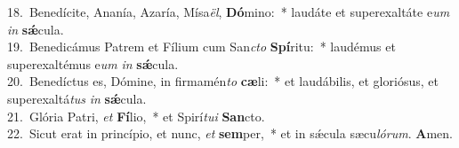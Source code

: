 {18.~}Benedícite, Ananía, Azaría, Mísa\textit{ël}, \textbf{Dó}mino:~* laudáte et superexaltáte e\textit{um} \textit{in} \textbf{sǽ}cula.\\
{19.~}Benedicámus Patrem et Fílium cum San\textit{cto} \textbf{Spí}ritu:~* laudémus et superexaltémus e\textit{um} \textit{in} \textbf{sǽ}cula.\\
{20.~}Benedíctus es, Dómine, in firmamén\textit{to} \textbf{cæ}li:~* et laudábilis, et gloriósus, et superexaltá\textit{tus} \textit{in} \textbf{sǽ}cula.\\
{21.~}Glória Patri, \textit{et} \textbf{Fí}lio,~* et Spirí\textit{tu}\textit{i} \textbf{San}cto.\\
{22.~}Sicut erat in princípio, et nunc, \textit{et} \textbf{sem}per,~* et in sǽcula sæcu\textit{ló}\textit{rum}. \textbf{A}men.\\
